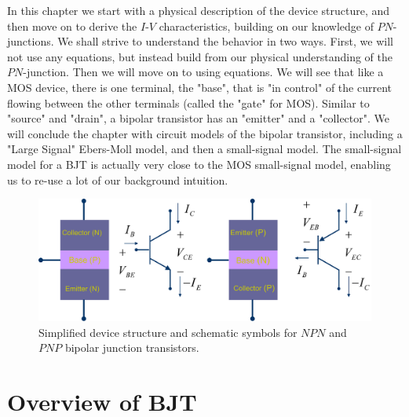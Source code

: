 In this chapter we start with a physical description of the device structure, and then move on to derive the $I$-$V$ characteristics, building on our knowledge of $PN$-junctions. We shall strive to understand the behavior in two ways.  First, we will not use any equations, but instead build from our physical understanding of the $PN$-junction.  Then we will move on to using equations.  We will see that like a MOS device, there is one terminal, the "base", that is "in control" of the current flowing between the other terminals (called the "gate" for MOS).  Similar to "source" and "drain", a bipolar transistor has an "emitter" and a "collector".
We will conclude the chapter with circuit models of the bipolar transistor, including a "Large Signal" Ebers-Moll model, and then a small-signal model.  The small-signal model for a BJT is actually very close to the MOS small-signal model, enabling us to re-use a lot of our background intuition.
\newpage
\begin{figure}[t]
\centering
\includegraphics[width=\columnwidth]{slide2_bjt_overview}
\caption{Simplified device structure and schematic symbols for $NPN$ and $PNP$ bipolar junction transistors.}
\label{fig:slide2_bjt_overview}
\end{figure}
\section{Overview of BJT}
